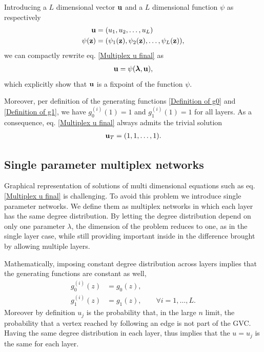 \documentclass[
11pt, %
english, %
singlespacing, %
nolistspacing, %
liststotoc, %
headsepline, %
]{MastersDoctoralThesis} %
\begin{document}
Introducing a $L$ dimensional vector $\boldsymbol{\mathrm{u}}$ and a $L$ dimensional function $\psi$ as respectively
\begin{align}
	\boldsymbol{\mathrm{u}} &= (u_1, u_2, \dots, u_L) \\
	\psi(\boldsymbol{\mathrm{z}}) &= (\psi_1(\boldsymbol{\mathrm{z}}), \psi_2(\boldsymbol{\mathrm{z}}), \dots, \psi_L(\boldsymbol{\mathrm{z}})),
\end{align}
we can compactly rewrite eq. \eqref{Multiplex u final} as
\begin{align}
	\boldsymbol{\mathrm{u}} = \psi(\boldsymbol{\mathrm{\lambda}}, \boldsymbol{\mathrm{u}}), \label{uvec as a fixpoint of psi}
\end{align}
which explicitly show that $\boldsymbol{\mathrm{u}}$ is a fixpoint of the function $\psi$.

Moreover, per definition of the generating functions \eqref{Definition of g0} and \eqref{Definition of g1}, we have $g^{(i)}_0(1) = 1$ and $g^{(i)}_1(1) = 1$ for all layers. As a consequence, eq. \eqref{Multiplex u final} always admits the trivial solution
\begin{align}
	\boldsymbol{\mathrm{u}}_T = (1, 1, \dots, 1). \label{Definition of multiplex trivial solution}
\end{align}


\subsection{Single parameter multiplex networks}

Graphical representation of solutions of multi dimensional equations such as eq. \eqref{Multiplex u final} is challenging. To avoid this problem we introduce single parameter networks. We define them as multiplex networks in which each layer has the same degree distribution. By letting the degree distribution depend on only one parameter $\lambda$, the dimension of the problem reduces to one, as in the single layer case, while still providing important inside in the difference brought by allowing multiple layers.

Mathematically, imposing constant degree distribution across layers implies that the generating functions are constant as well,
\begin{align}
	g^{(i)}_0(z) &= g_0(z), \\
	g^{(i)}_1(z) &= g_1(z), \qquad \forall i = 1, \dots, L.
\end{align}
Moreover by definition $u_j$ is the probability that, in the large $n$ limit, the probability that a vertex reached by following an edge is not part of the GVC. Having the same degree distribution in each layer, thus implies that the $u = u_j$ is the same for each layer.
\end{document}
